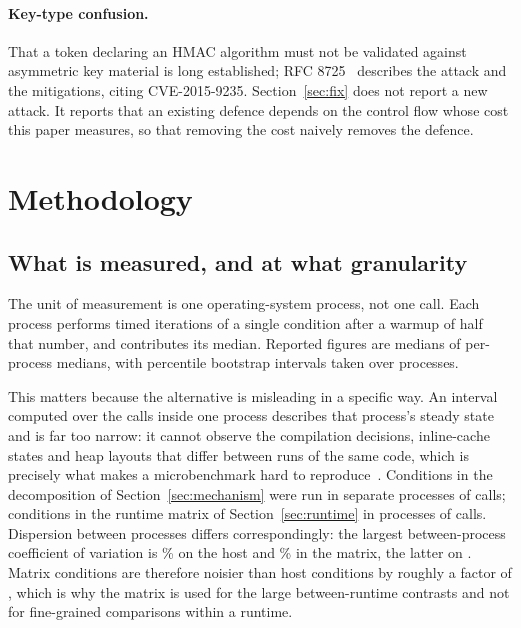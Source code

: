 \documentclass[pdflatex,sn-basic,twocolumn]{sn-jnl}
\begin{document}
\paragraph{Key-type confusion.} That a token declaring an HMAC algorithm must not
be validated against asymmetric key material is long established; RFC
8725~\cite{rfc8725} describes the attack and the mitigations, citing
CVE-2015-9235. Section~\ref{sec:fix} does not report a new attack. It reports
that an existing defence depends on the control flow whose cost this paper
measures, so that removing the cost naively removes the defence.

\section{Methodology}\label{sec:method}

\subsection{What is measured, and at what granularity}

The unit of measurement is one operating-system process, not one call. Each
process performs \HostCallsPerInvocation{} timed iterations of a single condition
after a warmup of half that number, and contributes its median. Reported figures
are medians of per-process medians, with percentile bootstrap intervals taken
over processes.

This matters because the alternative is misleading in a specific way. An interval
computed over the calls inside one process describes that process's steady state
and is far too narrow: it cannot observe the compilation decisions, inline-cache
states and heap layouts that differ between runs of the same code, which is
precisely what makes a microbenchmark hard to reproduce~\cite{georges2007statistically}.
Conditions in the decomposition of Section~\ref{sec:mechanism} were run in
\HostInvocations{} separate processes of \HostCallsPerInvocation{} calls;
conditions in the runtime matrix of Section~\ref{sec:runtime} in
\MatrixInvocations{} processes of \MatrixCallsPerInvocation{} calls. Dispersion
between processes differs correspondingly: the largest between-process
coefficient of variation is \HostCvMax\% on the host and \MatrixCvMax\% in the
matrix, the latter on \MatrixCvMaxCondition. Matrix conditions are therefore
noisier than host conditions by roughly a factor of \MatrixCvRatio, which is why
the matrix is used for the large between-runtime contrasts and not for
fine-grained comparisons within a runtime.
\end{document}
